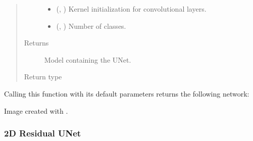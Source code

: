 \documentclass[letterpaper,10pt,english]{sphinxmanual}
\begin{document}
\begin{fulllineitems}
\begin{quote}
\begin{description}
\begin{itemize}
\item {} 
 (, ) \textendash{} Kernel initialization for convolutional layers.

\item {} 
 (, ) \textendash{} Number of classes.

\end{itemize}

\item[{Returns}] \leavevmode
{} \textendash{} Model containing the U\sphinxhyphen{}Net.

\item[{Return type}] \leavevmode
{}

\end{description}\end{quote}

Calling this function with its default parameters returns the following  network:


Image created with .

\end{fulllineitems}



\subsubsection{2D Residual U\sphinxhyphen{}Net}
\label{\detokenize{models/resunet:module-models.resunet}}\label{\detokenize{models/resunet:d-residual-u-net}}\label{\detokenize{models/resunet::doc}}
\end{document}
